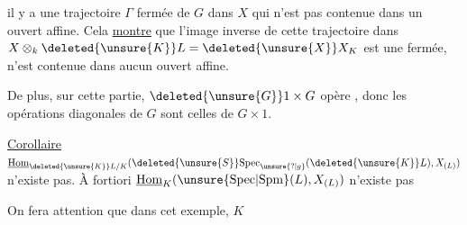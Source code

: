 
il y a  une trajectoire $\Gamma$ fermée de $G$ dans $X$ qui n'est pas contenue dans un ouvert affine. Cela  \uline{montre} que l'image inverse de cette trajectoire dans $X\otimes_k\deleted{\unsure{K}}L=\deleted{\unsure{X}}X_{K}$ est  une  fermée,  n'est contenue dans aucun ouvert affine. 


De plus, sur cette partie, $\deleted{\unsure{G}}1\times G$ opère , donc les opérations  diagonales de $G$ sont celles de $G\times1$.


\uline{Corollaire} $\underline{\mathrm{Hom}}_{\deleted{\unsure{K}}L/K}(\deleted{\unsure{S}}\mathrm{Spec}_{\unsure{?|g}}(\deleted{\unsure{K}}L),X_{(L)})$ n'existe pas. À fortiori $\underline{\mathrm{Hom}}_K(\unsure{\mathrm{Spec}|\mathrm{Spm}}(L),X_{(L)})$ n'existe pas

On fera attention que dans cet exemple, $K$

